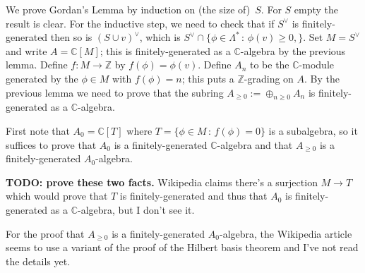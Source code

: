 \documentclass[english]{amsart}
\newcommand{\C}{\mathbb{C}}
\newcommand{\Z}{\mathbb{Z}}
\begin{document}
We prove Gordan's Lemma by induction on (the size of)~$S$. For $S$ empty the result is clear. For the inductive step, we need to check that if $S^\vee$ is finitely-generated then so is $(S\cup{v})^\vee$, which is $S^\vee\cap\{\phi\in\Lambda^*\,:\,\phi(v)\geq0,\}$. Set $M=S^\vee$ and write $A=\C[M]$; this is finitely-generated as a $\mathbb{C}$-algebra by the previous lemma. Define $f:M\to\Z$ by $f(\phi)=\phi(v)$. Define $A_n$ to be the $\C$-module generated by the $\phi\in M$ with $f(\phi)=n$; this puts a $\Z$-grading on $A$. By the previous lemma we need to prove that the subring $A_{\geq0}:=\oplus_{n\geq0}A_n$ is finitely-generated as a $\mathbb{C}$-algebra.

First note that $A_0=\C[T]$ where $T=\{\phi\in M\,:\,f(\phi)=0\}$ is a subalgebra, so it suffices to prove that $A_0$ is a finitely-generated $\C$-algebra and that $A_{\geq0}$ is a finitely-generated $A_0$-algebra.

{\bf TODO: prove these two facts.} Wikipedia claims there's a surjection $M\to T$ which would prove that $T$ is finitely-generated and thus that $A_0$ is finitely-generated as a $\C$-algebra, but I don't see it.

For the proof that $A_{\geq0}$ is a finitely-generated $A_0$-algebra, the Wikipedia article seems to use a variant of the proof of the Hilbert basis theorem and I've not read the details yet.
\end{document}
